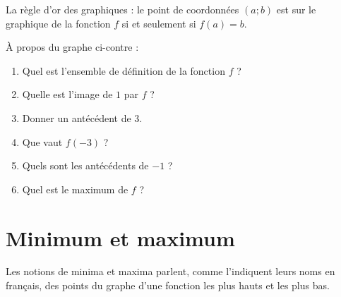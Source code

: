 \begin{Aretenir}
    La règle d'or des graphiques : le point de coordonnées \( (a;b)\) est sur le graphique de la fonction \( f\) si et seulement si \( f(a)=b\).
\end{Aretenir}

\begin{multicols}{2}

À propos du graphe ci-contre :
\begin{enumerate}
    \item
        Quel est l'ensemble de définition de la fonction \( f\) ?
    \item
        Quelle est l'image de \( 1\) par \( f\) ?
    \item
        Donner un antécédent de \( 3\).
    \item
        Que vaut \( f(-3)\) ?
    \item
        Quels sont les antécédents de \( -1\) ?
    \item 
        Quel est le maximum de \( f\) ?
\end{enumerate}
    
    \columnbreak

\begin{center}
   
\end{center}

\end{multicols}


    \section{Minimum et maximum}


Les notions de minima et maxima parlent, comme l'indiquent leurs noms en français, des points du graphe d'une fonction les plus hauts et les plus bas.


